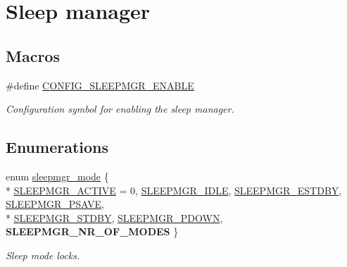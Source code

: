 \hypertarget{group__sleepmgr__group}{\section{Sleep manager}
\label{group__sleepmgr__group}
}
\subsection*{Macros}
\begin{DoxyCompactItemize}
\item 
\#define \hyperlink{group__sleepmgr__group_gad8e649a9d53092c580960f2f9886ee98}{C\-O\-N\-F\-I\-G\-\_\-\-S\-L\-E\-E\-P\-M\-G\-R\-\_\-\-E\-N\-A\-B\-L\-E}
\begin{DoxyCompactList}\small\item\em Configuration symbol for enabling the sleep manager. \end{DoxyCompactList}\end{DoxyCompactItemize}
\subsection*{Enumerations}
\begin{DoxyCompactItemize}
\item 
enum \hyperlink{group__sleepmgr__group_gaa990bc3ea16fcad09009cdc70dbc38c6}{sleepmgr\-\_\-mode} \{ \\*
\hyperlink{group__sleepmgr__group_ggaa990bc3ea16fcad09009cdc70dbc38c6a04a2ceb6fc138cae84e9334cfa90d89f}{S\-L\-E\-E\-P\-M\-G\-R\-\_\-\-A\-C\-T\-I\-V\-E} =  0, 
\hyperlink{group__sleepmgr__group_ggaa990bc3ea16fcad09009cdc70dbc38c6ae4f3742b3532d5ebabef6f26fabf4487}{S\-L\-E\-E\-P\-M\-G\-R\-\_\-\-I\-D\-L\-E}, 
\hyperlink{group__sleepmgr__group_ggaa990bc3ea16fcad09009cdc70dbc38c6a8e3db847116653761bbda8ebee351a75}{S\-L\-E\-E\-P\-M\-G\-R\-\_\-\-E\-S\-T\-D\-B\-Y}, 
\hyperlink{group__sleepmgr__group_ggaa990bc3ea16fcad09009cdc70dbc38c6a3f6d9b3707e126239cbc3ed7d8e45934}{S\-L\-E\-E\-P\-M\-G\-R\-\_\-\-P\-S\-A\-V\-E}, 
\\*
\hyperlink{group__sleepmgr__group_ggaa990bc3ea16fcad09009cdc70dbc38c6affb1e224bd127ccf5c7b54a54c3ba665}{S\-L\-E\-E\-P\-M\-G\-R\-\_\-\-S\-T\-D\-B\-Y}, 
\hyperlink{group__sleepmgr__group_ggaa990bc3ea16fcad09009cdc70dbc38c6a1807014e0e226d5b21cfc12d5061c8d0}{S\-L\-E\-E\-P\-M\-G\-R\-\_\-\-P\-D\-O\-W\-N}, 
{\bfseries S\-L\-E\-E\-P\-M\-G\-R\-\_\-\-N\-R\-\_\-\-O\-F\-\_\-\-M\-O\-D\-E\-S}
 \}
\begin{DoxyCompactList}\small\item\em Sleep mode locks. \end{DoxyCompactList}\end{DoxyCompactItemize}


